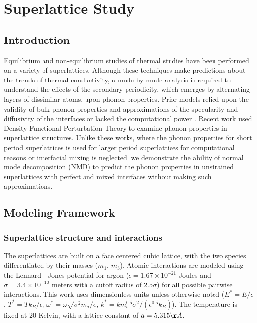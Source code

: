 \chapter{Superlattice Study}

\section{Introduction}
Equilibrium \cite {PhysRevB.85.195302} and non-equilibrium \cite {PhysRevB.79.214307,PhysRevB.79.075316,PhysRevB.72.174302} studies of thermal studies have been performed on a variety of superlattices. Although these techniques make predictions about the trends of thermal conductivity, a mode by mode analysis is required to understand the effects of the secondary periodicity, which emerges by alternating layers of dissimilar atoms, upon phonon properties. Prior models relied upon the validity of bulk phonon properties\cite{walkauskas:2579,chen:220} and approximations of the specularity and diffusivity of the interfaces \cite {PhysRevB.57.14958} or lacked the computational power \cite {PhysRevB.70.081310}. Recent work used Density Functional Perturbation Theory to examine phonon properties in superlattice structures.\cite{Luckyanova16112012,doi:10.1021/nl202186y} Unlike these works, where the phonon properties for short period superlattices is used for larger period superlattices for computational reasons \cite{Luckyanova16112012, doi:10.1021/nl202186y} or interfacial mixing is neglected,\cite{doi:10.1021/nl202186y} we demonstrate the ability of normal mode decomposition (NMD) to predict the phonon properties in unstrained superlattices with perfect and mixed interfaces without making such approximations.
\section{Modeling Framework}
\subsection{Superlattice structure and interactions}\label{SEC:sl_struc}
The superlattices are built on a face centered cubic lattice,  with the two species differentiated by their masses ($m_1$, $m_3$). Atomic interactions are modeled using the Lennard - Jones potential for argon ($\epsilon= 1.67\times10^{-21}$ Joules and $\sigma= 3.4\times10^{-10}$ meters with a cutoff radius of $2.5\sigma$) for all possible pairwise interactions. This work uses dimensionless units unless otherwise noted ($E^*=E/\epsilon$, $T^*=Tk_B/\epsilon$, $\omega^*=\omega\sqrt{\sigma^2m_a/\epsilon}$, $k^*=km^{0.5}_a\sigma^2/(\epsilon^{0.5}k_B)$). The temperature is fixed at 20 Kelvin, with a lattice constant of $a=5.315 \AA$.\cite{alan}

